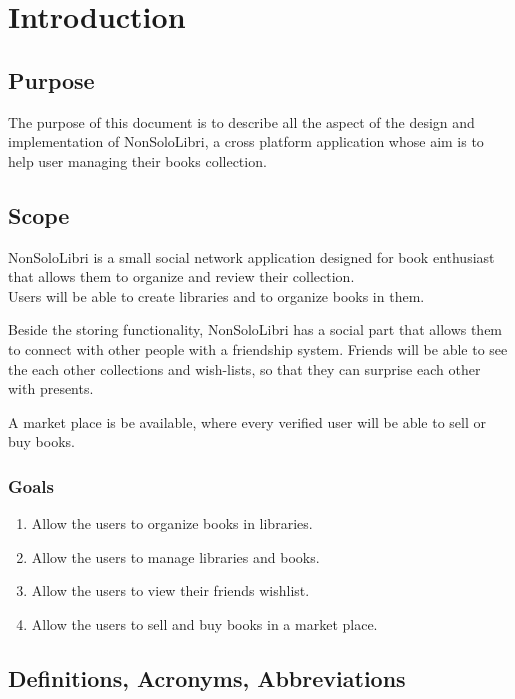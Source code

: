 \chapter{Introduction}
\section{Purpose}
The purpose of this document is to describe all the aspect of the design and implementation of NonSoloLibri, a cross platform application whose aim is to help user managing their books collection.


\section{Scope}
NonSoloLibri is a small social network application designed for book enthusiast that allows them to organize and review their collection.\\
Users will be able to create libraries and to organize books in them.

Beside the storing functionality, NonSoloLibri has a social part that allows them to connect with other people with a friendship system.
Friends will be able to see the each other collections and wish-lists, so that they can surprise each other with presents.

A market place is be available, where every verified user will be able to sell or buy books.
\subsection{Goals}

\begin{enumerate}
    \item Allow the users to organize books in libraries.
    \item Allow the users to manage libraries and books.
    \item Allow the users to view their friends wishlist.
    \item Allow the users to sell and buy books in a market place.
\end{enumerate}


\section{Definitions, Acronyms, Abbreviations}

